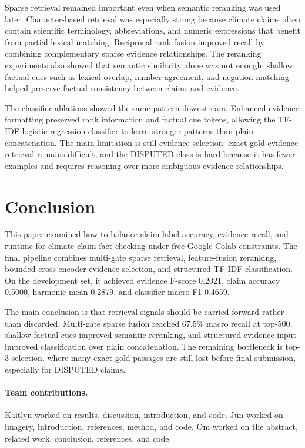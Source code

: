 \documentclass[11pt]{article}
\begin{document}
Sparse retrieval remained important even when semantic reranking was used later.
Character-based retrieval was especially strong because climate claims often
contain scientific terminology, abbreviations, and numeric expressions that
benefit from partial lexical matching. Reciprocal rank fusion improved recall
by combining complementary sparse evidence relationships. The reranking
experiments also showed that semantic similarity alone was not enough: shallow
factual cues such as lexical overlap, number agreement, and negation matching
helped preserve factual consistency between claims and evidence.

The classifier ablations showed the same pattern downstream. Enhanced evidence
formatting preserved rank information and factual cue tokens, allowing the
TF-IDF logistic regression classifier to learn stronger patterns than plain
concatenation. The main limitation is still evidence selection: exact gold
evidence retrieval remains difficult, and the DISPUTED class is hard because it
has fewer examples and requires reasoning over more ambiguous evidence
relationships.

\section{Conclusion}
\enlargethispage{4\baselineskip}

This paper examined how to balance claim-label accuracy, evidence recall, and
runtime for climate claim fact-checking under free Google Colab constraints.
The final pipeline combines multi-gate sparse retrieval, feature-fusion
reranking, bounded cross-encoder evidence selection, and structured TF-IDF
classification. On the development set, it achieved evidence F-score 0.2021,
claim accuracy 0.5000, harmonic mean 0.2879, and classifier macro-F1 0.4659.

The main conclusion is that retrieval signals should be carried forward rather
than discarded. Multi-gate sparse fusion reached 67.5\% macro recall at top-500,
shallow factual cues improved semantic reranking, and structured evidence input
improved classification over plain concatenation. The remaining bottleneck is
top-3 selection, where many exact gold passages are still lost before final
submission, especially for DISPUTED claims.

\paragraph{Team contributions.}
Kaitlyn worked on results, discussion, introduction, and code. Jun worked on
imagery, introduction, references, method, and code. Om worked on the abstract,
related work, conclusion, references, and code.

\begingroup
\small
\setlength{\bibsep}{0pt}

\endgroup
\end{document}
